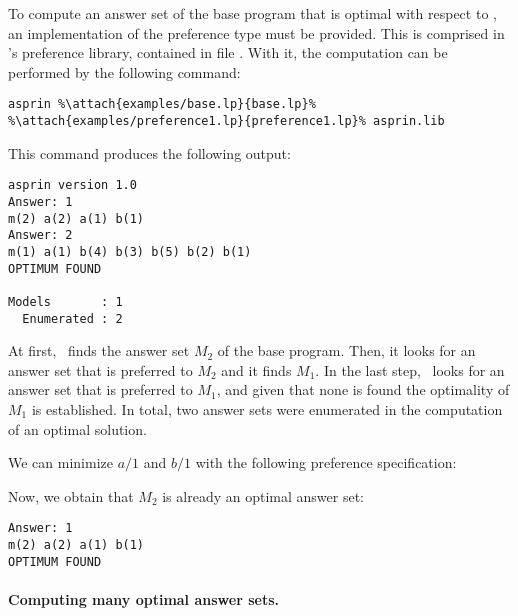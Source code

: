 \begin{example}
To compute an answer set of the base program that is optimal with respect to , 
an implementation of the preference type  must be provided.
This is comprised in \asprin's preference library,
contained in file .
With it, the computation can be performed by the following command:
%
%
\begin{lstlisting}[numbers=none,escapechar=\%]
asprin %\attach{examples/base.lp}{base.lp}% %\attach{examples/preference1.lp}{preference1.lp}% asprin.lib
\end{lstlisting}
%
This command produces the following output:
%
\begin{lstlisting}[numbers=none]
asprin version 1.0
Answer: 1
m(2) a(2) a(1) b(1)
Answer: 2
m(1) a(1) b(4) b(3) b(5) b(2) b(1)
OPTIMUM FOUND

Models       : 1
  Enumerated : 2

\end{lstlisting}
%
At first, \asprin\ finds the answer set $M_2$ of the base program. 
Then, it looks for an answer set that is preferred to $M_2$ and it finds $M_1$. 
In the last step, \asprin\ looks for an answer set that is preferred to $M_1$,  
and given that none is found the optimality of $M_1$ is established. 
In total, two answer sets were enumerated in the computation of an optimal solution.

We can minimize $a/1$ and $b/1$ with the following preference specification:
%

%
Now, we obtain that $M_2$ is already an optimal answer set: 
\begin{lstlisting}[numbers=none]
Answer: 1
m(2) a(2) a(1) b(1)
OPTIMUM FOUND
\end{lstlisting}
\eexample
\end{example}

\paragraph{Computing many optimal answer sets.}

